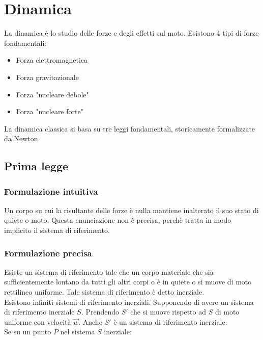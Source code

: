\documentclass{subfiles}
\begin{document}
\section{Dinamica}

La dinamica è lo studio delle forze e degli effetti sul moto.
Esistono 4 tipi di forze fondamentali:

\begin{itemize}
    \item Forza elettromagnetica
    \item Forza gravitazionale
    \item Forza "nucleare debole"
    \item Forza "nucleare forte"
\end{itemize}

\noindent
La dinamica classica si basa su tre leggi fondamentali, storicamente formalizzate da Newton.

\subsection{Prima legge}

\subsubsection{Formulazione intuitiva}

Un corpo su cui la risultante delle forze è nulla mantiene inalterato il suo stato di quiete o moto.
Questa enunciazione non è precisa, perchè tratta in modo implicito il sistema di riferimento.

\subsubsection{Formulazione precisa}

Esiste un sistema di riferimento tale che un corpo materiale che sia sufficientemente lontano da tutti gli altri corpi o è in quiete o si muove di moto rettilineo uniforme.
Tale sistema di riferimento è detto inerziale.\\

\noindent
Esistono infiniti sistemi di riferimento inerziali.
Supponendo di avere un sistema di riferimento inerziale $S$.
Prendendo $S'$ che si muove rispetto ad $S$ di moto uniforme con velocità $\vec{w}$.
Anche $S'$ è un sistema di riferimento inerziale.\\

\noindent
Se su un punto $P$ nel sistema $S$ inerziale:
\end{document}

